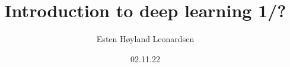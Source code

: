 \documentclass[t]{beamer}
\author{Esten H{\o}yland Leonardsen}
\institute[Life Science, UiO]{UiO:Life Science, University of Oslo}
\date{02.11.22}
\title{Introduction to deep learning 1/?}
\begin{document}
	\def\nodesize{14pt}










\end{document}
